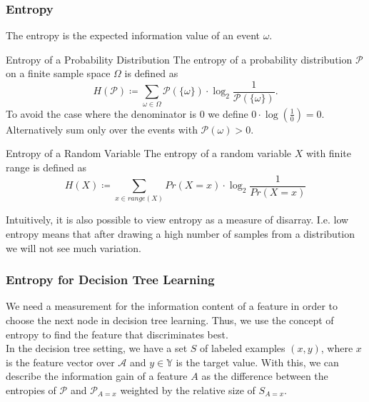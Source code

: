 \documentclass[english]{panikzettel}
\begin{document}
\subsubsection{Entropy}
The entropy is the expected information value of an event $\omega$.

\begin{halfboxl}
\vspace{-\baselineskip}
\begin{defi}{Entropy of a Probability Distribution}
The entropy of a probability distribution $\mathcal{P}$ on a finite sample space $\Omega$ is defined as
\[
H(\mathcal{P})\coloneqq \sum_{\omega\in\Omega}\mathcal{P}(\{\omega \})\cdot \log_2\frac{1}{\mathcal{P}(\{\omega \})}.
\]
To avoid the case where the denominator is 0 we define $0\cdot \log (\frac{1}{0})=0$. Alternatively sum only over the events with $\mathcal{P}(\omega)>0$.
\end{defi}
\end{halfboxl}
\begin{halfboxr}
\vspace{-\baselineskip}
\begin{defi}{Entropy of a Random Variable}
The entropy of a random variable $X$ with finite range is defined as
{\small{}
\[
H(X)\coloneqq \sum_{x\in range(X)}Pr(X=x)\cdot\log_2 \frac{1}{Pr(X=x)}
\]}
\end{defi}

Intuitively, it is also possible to view entropy as a measure of disarray. I.e. low entropy means that after drawing a high number of samples from a distribution we will not see much variation.

\end{halfboxr}


\subsubsection{Entropy for Decision Tree Learning}
\label{entropy_decision_trees}

We need a measurement for the information content of a feature in order to choose the next node in decision tree learning.
Thus, we use the concept of entropy to find the feature that discriminates best.\\
In the decision tree setting, we have a set $S$ of labeled examples $(x,y)$, where $x$ is the feature vector over $\mathcal{A}$ and $y\in\mathbb{Y}$ is the target value.
With this, we can describe the information gain of a feature $A$ as the difference between the entropies of $\mathcal{P}$ and $\mathcal{P}_{A=x}$ weighted by the relative size of $S_{A=x}$.
\end{document}
